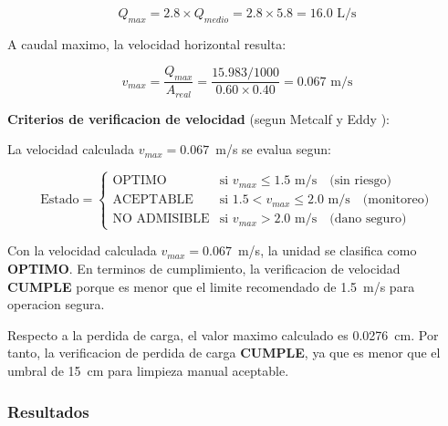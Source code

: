 \documentclass[12pt,a4paper]{article}
\begin{document}
\begin{equation}
Q_{{max}} = 2.8 \times Q_{{medio}} = 2.8 \times 5.8 = 16.0 \text{ L/s}
\end{equation}

A caudal maximo, la velocidad horizontal resulta:

\begin{equation}
v_{{max}} = \frac{Q_{{max}}}{A_{{real}}} = \frac{15.983/1000}{0.60 \times 0.40} = 0.067 \text{ m/s}
\end{equation}

\textbf{Criterios de verificacion de velocidad} (segun Metcalf y Eddy \cite{metcalf2014}):

La velocidad calculada $v_{{max}} = 0.067$~m/s se evalua segun:

\begin{equation}
\text{Estado} = \begin{cases}
    \text{OPTIMO} & \text{si } v_{{max}} \leq 1.5 \text{ m/s} \quad \text{(sin riesgo)} \\
    \text{ACEPTABLE} & \text{si } 1.5 < v_{{max}} \leq 2.0 \text{ m/s} \quad \text{(monitoreo)} \\
    \text{NO ADMISIBLE} & \text{si } v_{{max}} > 2.0 \text{ m/s} \quad \text{(dano seguro)}
\end{cases}
\end{equation}

Con la velocidad calculada $v_{{max}} = 0.067$~m/s, la unidad se clasifica como \textbf{OPTIMO}. En terminos de cumplimiento, la verificacion de velocidad \textbf{CUMPLE} porque es menor que el limite recomendado de 1.5~m/s para operacion segura.

Respecto a la perdida de carga, el valor maximo calculado es 0.0276~cm. Por tanto, la verificacion de perdida de carga \textbf{CUMPLE}, ya que es menor que el umbral de 15~cm para limpieza manual aceptable.

\subsubsection{Resultados}
\end{document}
